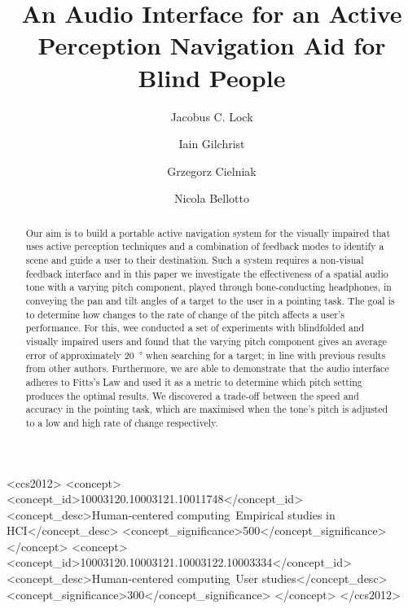 \documentclass[sigconf, review=true, screen=true, anonymous=true]{acmart}
\begin{document}
\title{An Audio Interface for an Active Perception Navigation Aid for Blind People}

\author{Jacobus C. Lock}

\author{Iain Gilchrist}

\author{Grzegorz Cielniak}

\author{Nicola Bellotto}

\begin{abstract}
	Our aim is to build a portable active navigation system for the visually impaired that uses active perception techniques and a combination of feedback modes to identify a scene and guide a user to their destination.
	Such a system requires a non-visual feedback interface and in this paper we investigate the effectiveness of a spatial audio tone with a varying pitch component, played through bone-conducting headphones, in conveying the pan and tilt angles of a target to the user in a pointing task.
	The goal is to determine how changes to the rate of change of the pitch affects a user's performance.
	For this, wee conducted a set of experiments with blindfolded and visually impaired users and found that the varying pitch component gives an average error of approximately \SI{20}{\degree} when searching for a target; in line with previous results from other authors.
	Furthermore, we are able to demonstrate that the audio interface adheres to Fitts's Law and used it as a metric to determine which pitch setting produces the optimal results.
	We discovered a trade-off between the speed and accuracy in the pointing task, which are maximised when the tone's pitch is adjusted to a low and high rate of change respectively. 
\end{abstract}

 \begin{CCSXML}
<ccs2012>
<concept>
<concept_id>10003120.10003121.10011748</concept_id>
<concept_desc>Human-centered computing~Empirical studies in HCI</concept_desc>
<concept_significance>500</concept_significance>
</concept>
<concept>
<concept_id>10003120.10003121.10003122.10003334</concept_id>
<concept_desc>Human-centered computing~User studies</concept_desc>
<concept_significance>300</concept_significance>
</concept>
</ccs2012>
\end{CCSXML}
\end{document}
